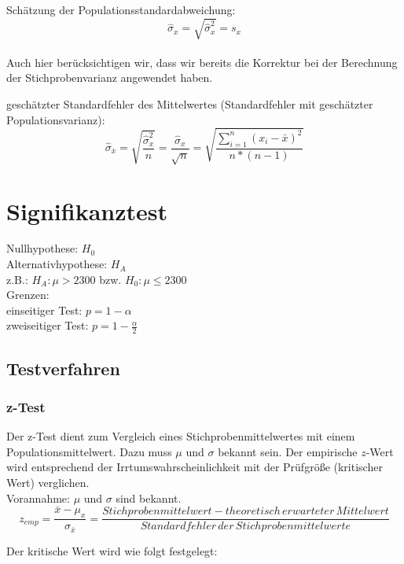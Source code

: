 \documentclass[11pt,a4paper]{article}
\begin{document}
Schätzung der Populationsstandardabweichung:\\
$$\hat{\sigma}_{x} = \sqrt{\hat{\sigma}^2_x} = s_x $$\\

Auch hier berücksichtigen wir, dass wir bereits die Korrektur bei der Berechnung der Stichprobenvarianz angewendet haben. 

geschätzter Standardfehler des Mittelwertes (Standardfehler mit geschätzter Populationsvarianz):\\
$$\hat{\sigma}_{\bar{x}} = \sqrt{ \frac{\hat{\sigma}^2_{x} } {n} } = \frac{\hat{\sigma}_{x}} { \sqrt{n}} =\sqrt{\frac{\sum\limits_{i=1}^n (x_{i} - \bar{x})^2}{n *(n-1)}}$$


\section{Signifikanztest}
Nullhypothese: $H_0$ \\
Alternativhypothese: $H_A$ \\
z.B.: $H_A: \mu > 2300$ bzw. $H_0: \mu \leq 2300$ \\

Grenzen: \\
einseitiger Test: $p = 1 - \alpha$ \\
zweiseitiger Test: $p = 1 - \frac{\alpha}{2}$ \\

\subsection{Testverfahren}

\subsubsection{z-Test}
Der z-Test dient zum Vergleich eines Stichprobenmittelwertes mit einem Populationsmittelwert. Dazu muss $\mu$ und $\sigma$ bekannt sein. Der empirische $z$-Wert wird entsprechend der Irrtumswahrscheinlichkeit mit der Prüfgröße (kritischer Wert) verglichen. \\
Vorannahme: $\mu$ und $\sigma$ sind bekannt. \\

$$z_{emp} = \frac{\bar{x} - \mu_x}{\sigma_{\bar{x}}} = \frac{Stichprobenmittelwert -  theoretisch \, erwarteter \, Mittelwert}{Standardfehler \, der \, Stichprobenmittelwerte}$$

Der kritische Wert wird wie folgt festgelegt:
\end{document}
